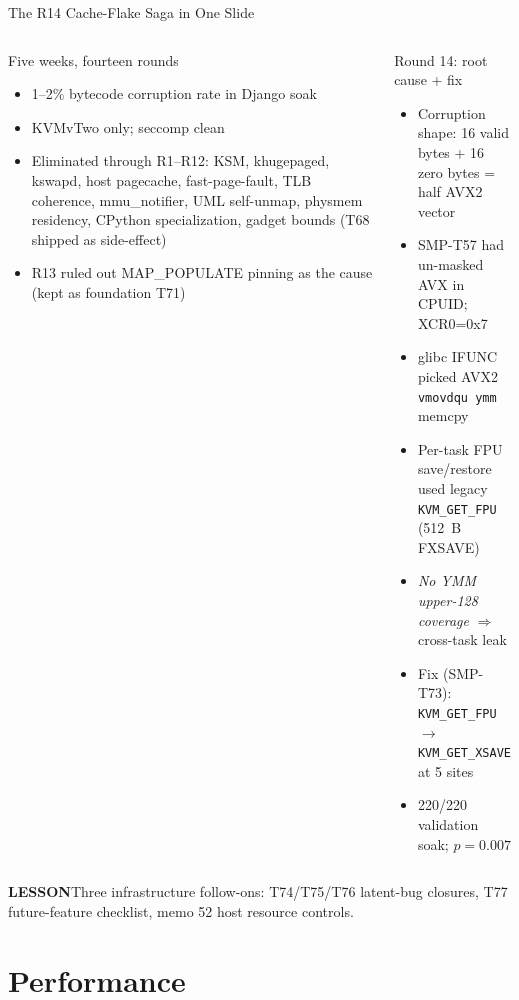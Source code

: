 \documentclass[aspectratio=169,11pt]{beamer}
\newcommand{\pill}[2]{\colorbox{#1!14}{\textcolor{#1}{\footnotesize\textbf{#2}}}}
\begin{document}
\begin{frame}{The R14 Cache-Flake Saga in One Slide}
\scriptsize
\begin{columns}[T,onlytextwidth]
\begin{block}{Five weeks, fourteen rounds}
\begin{itemize}
  \item 1--2\% bytecode corruption rate in Django soak
  \item KVMvTwo{} only; seccomp clean
  \item Eliminated through R1--R12: KSM, khugepaged, kswapd, host pagecache, fast-page-fault, TLB coherence, mmu\_notifier, UML self-unmap, physmem residency, CPython specialization, gadget bounds (T68 shipped as side-effect)
  \item R13 ruled out MAP\_POPULATE pinning as the cause (kept as foundation T71)
\end{itemize}
\end{block}
\begin{block}{Round 14: root cause + fix}
\begin{itemize}
  \item Corruption shape: 16 valid bytes + 16 zero bytes = half AVX2 vector
  \item SMP-T57 had un-masked AVX in CPUID; XCR0=0x7
  \item glibc IFUNC picked AVX2 \texttt{vmovdqu ymm} memcpy
  \item Per-task FPU save/restore used legacy \texttt{KVM\_GET\_FPU} (512~B FXSAVE)
  \item \emph{No YMM upper-128 coverage} $\Rightarrow$ cross-task leak
  \item Fix (SMP-T73): \texttt{KVM\_GET\_FPU} $\to$ \texttt{KVM\_GET\_XSAVE} at 5 sites
  \item 220/220 validation soak; $p = 0.007$
\end{itemize}
\end{block}
\end{columns}
\vspace{0.4em}
\centering
\pill{UMLBlue}{LESSON}\quad Three infrastructure follow-ons: T74/T75/T76 latent-bug closures, T77 future-feature checklist, memo 52 host resource controls.
\end{frame}

\section{Performance}
\end{document}
